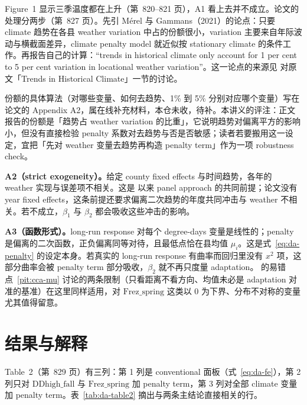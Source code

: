 \begin{pitfall}
Figure~1 显示三季温度都在上升（第~820--821 页），A1 看上去并不成立。论文的处理分两步（第~827 页）。先引 Mérel 与 Gammans（2021）的论点：只要 climate 趋势在各县 weather variation 中占的份额很小，variation 主要来自年际波动与横截面差异，climate penalty model 就近似按 stationary climate 的条件工作。再报告自己的计算：``trends in historical climate only account for 1 per cent to 5 per cent variation in locational weather variation''\citep[第~827 页]{da2024climate}。这一论点的来源见  对原文「Trends in Historical Climate」一节的讨论。

份额的具体算法（对哪些变量、如何去趋势、1\% 到 5\% 分别对应哪个变量）写在论文的 Appendix A2，属在线补充材料，本仓未收，待补。本讲义的评注：正文报告的份额是「趋势占 weather variation 的比重」，它说明趋势对偏离平方的影响小，但没有直接检验 penalty 系数对去趋势与否是否敏感；读者若要搬用这一设定，宜把「先对 weather 变量去趋势再构造 penalty term」作为一项 robustness check。
\end{pitfall}

\textbf{A2（strict exogeneity）。}给定 county fixed effects 与时间趋势，各年的 weather 实现与误差项不相关。这是  以来 panel approach 的共同前提；论文没有 year fixed effects，这条前提还要求偏离二次趋势的年度共同冲击与 weather 不相关。若不成立，$\beta_1$ 与 $\beta_2$ 都会吸收这些冲击的影响。

\textbf{A3（函数形式）。}long-run response 对每个 degree-days 变量是线性的；penalty 是偏离的二次函数，正负偏离同等对待，且最低点恰在县均值 $\mu_i$。这是式~\ref{eq:da-penalty} 的设定本身。若真实的 long-run response 有曲率而回归里没有 $x^2$ 项，这部分曲率会被 penalty term 部分吸收，$\beta_2$ 就不再只度量 adaptation。 的易错点~\ref{pit:cca-mu} 讨论的两条限制（只看距离不看方向、均值未必是 adaptation 对准的基准）在这里同样适用，对 $\mathrm{Frez\_spring}$ 这类以 0 为下界、分布不对称的变量尤其值得留意。

\section{结果与解释}

Table~2（第~829 页）有三列：第 1 列是 conventional 面板（式~\ref{eq:da-fe}），第 2 列只对 $\mathrm{DDhigh\_fall}$ 与 $\mathrm{Frez\_spring}$ 加 penalty term，第 3 列对全部 climate 变量加 penalty term。表~\ref{tab:da-table2} 摘出与两条主结论直接相关的行。


